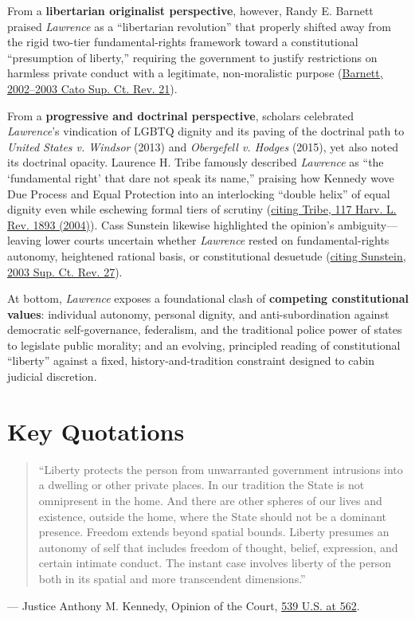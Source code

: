 \documentclass[12pt]{article}
\begin{document}
From a \textbf{libertarian originalist perspective}, however, Randy E. Barnett praised \textit{Lawrence} as a ``libertarian revolution'' that properly shifted away from the rigid two-tier fundamental-rights framework toward a constitutional ``presumption of liberty,'' requiring the government to justify restrictions on harmless private conduct with a legitimate, non-moralistic purpose (\href{https://scholarship.law.georgetown.edu/cgi/viewcontent.cgi?article=1854&context=facpub}{Barnett, 2002--2003 Cato Sup. Ct. Rev. 21}).

From a \textbf{progressive and doctrinal perspective}, scholars celebrated \textit{Lawrence}'s vindication of LGBTQ dignity and its paving of the doctrinal path to \textit{United States v. Windsor} (2013) and \textit{Obergefell v. Hodges} (2015), yet also noted its doctrinal opacity. Laurence H. Tribe famously described \textit{Lawrence} as ``the `fundamental right' that dare not speak its name,'' praising how Kennedy wove Due Process and Equal Protection into an interlocking ``double helix'' of equal dignity even while eschewing formal tiers of scrutiny (\href{https://harvardlawreview.org/forum/vol-133/criminal-justice-user-fees-and-the-procedural-aspect-of-equal-justice/}{citing Tribe, 117 Harv. L. Rev. 1893 (2004)}). Cass Sunstein likewise highlighted the opinion's ambiguity---leaving lower courts uncertain whether \textit{Lawrence} rested on fundamental-rights autonomy, heightened rational basis, or constitutional desuetude (\href{https://scholarship.law.wm.edu/cgi/viewcontent.cgi?article=1647&context=wmborj}{citing Sunstein, 2003 Sup. Ct. Rev. 27}).

At bottom, \textit{Lawrence} exposes a foundational clash of \textbf{competing constitutional values}: individual autonomy, personal dignity, and anti-subordination against democratic self-governance, federalism, and the traditional police power of states to legislate public morality; and an evolving, principled reading of constitutional ``liberty'' against a fixed, history-and-tradition constraint designed to cabin judicial discretion.

\section{Key Quotations}
\begin{quote}
``Liberty protects the person from unwarranted government intrusions into a dwelling or other private places. In our tradition the State is not omnipresent in the home. And there are other spheres of our lives and existence, outside the home, where the State should not be a dominant presence. Freedom extends beyond spatial bounds. Liberty presumes an autonomy of self that includes freedom of thought, belief, expression, and certain intimate conduct. The instant case involves liberty of the person both in its spatial and more transcendent dimensions.''
\end{quote}
\noindent --- Justice Anthony M. Kennedy, Opinion of the Court, \href{https://www.law.cornell.edu/supremecourt/text/02-102}{539 U.S. at 562}.
\end{document}
